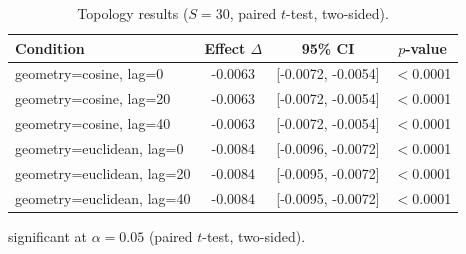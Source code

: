 \begin{table}[t]
  \centering
  \caption{Topology results ($S=30$, paired $t$-test, two-sided).}
  \label{tab:topology}
  \begin{tabular}{lccc}
    \toprule
    Condition & Effect $\Delta$ & 95\% CI & $p$-value \\
    \midrule
    geometry=cosine, lag=0 & -0.0063\dag{} & [-0.0072, -0.0054] & $<$0.0001 \\
    geometry=cosine, lag=20 & -0.0063\dag{} & [-0.0072, -0.0054] & $<$0.0001 \\
    geometry=cosine, lag=40 & -0.0063\dag{} & [-0.0072, -0.0054] & $<$0.0001 \\
    geometry=euclidean, lag=0 & -0.0084\dag{} & [-0.0096, -0.0072] & $<$0.0001 \\
    geometry=euclidean, lag=20 & -0.0084\dag{} & [-0.0095, -0.0072] & $<$0.0001 \\
    geometry=euclidean, lag=40 & -0.0084\dag{} & [-0.0095, -0.0072] & $<$0.0001 \\
    \bottomrule
  \end{tabular}
  \begin{minipage}{\linewidth}
    \vspace{4pt}
    \footnotesize \dag{} significant at $\alpha = 0.05$ (paired $t$-test, two-sided).
  \end{minipage}
\end{table}